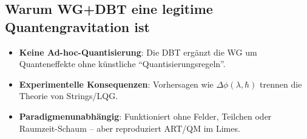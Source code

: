 

\subsection*{Warum WG+DBT eine legitime Quantengravitation ist}  
\begin{itemize}  
\item \textbf{Keine Ad-hoc-Quantisierung}: Die DBT ergänzt die WG um Quanteneffekte ohne künstliche \enquote{Quantisierungsregeln}.  
\item \textbf{Experimentelle Konsequenzen}: Vorhersagen wie $\Delta\phi(\lambda, \hbar)$ trennen die Theorie von Strings/LQG.  
\item \textbf{Paradigmenunabhängig}: Funktioniert ohne Felder, Teilchen oder Raumzeit-Schaum – aber reproduziert ART/QM im Limes.  
\end{itemize}

